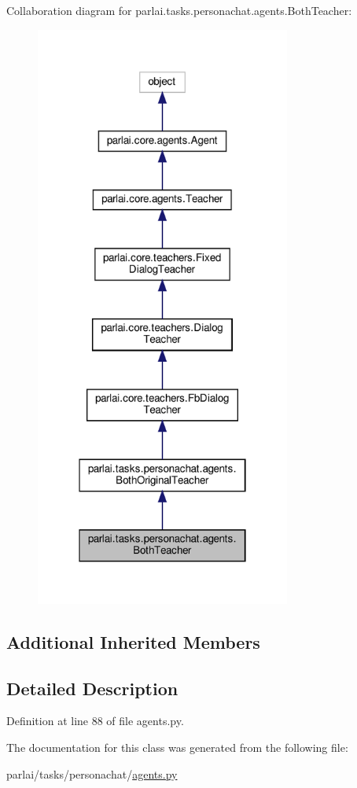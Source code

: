 Collaboration diagram for parlai.\+tasks.\+personachat.\+agents.\+Both\+Teacher\+:
\nopagebreak
\begin{figure}[H]
\begin{center}
\leavevmode
\includegraphics[width=238pt]{classparlai_1_1tasks_1_1personachat_1_1agents_1_1BothTeacher__coll__graph}
\end{center}
\end{figure}
\subsection*{Additional Inherited Members}


\subsection{Detailed Description}


Definition at line 88 of file agents.\+py.



The documentation for this class was generated from the following file\+:\begin{DoxyCompactItemize}
\item 
parlai/tasks/personachat/\hyperlink{parlai_2tasks_2personachat_2agents_8py}{agents.\+py}\end{DoxyCompactItemize}
